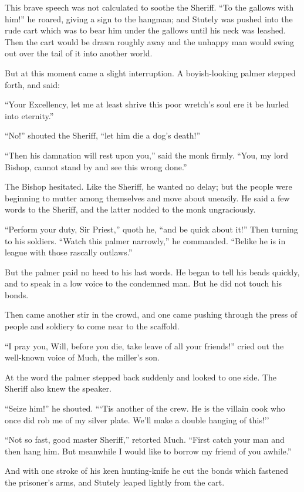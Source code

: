 This brave speech was not calculated to soothe the Sheriff. ``To the
gallows with him!'' he roared, giving a sign to the hangman; and Stutely
was pushed into the rude cart which was to bear him under the gallows
until his neck was leashed. Then the cart would be drawn roughly away
and the unhappy man would swing out over the tail of it into another
world.

But at this moment came a slight interruption. A boyish-looking palmer
stepped forth, and said:

``Your Excellency, let me at least shrive this poor wretch's soul ere it
be hurled into eternity.''

``No!'' shouted the Sheriff, ``let him die a dog's death!''

``Then his damnation will rest upon you,'' said the monk firmly. ``You,
my lord Bishop, cannot stand by and see this wrong done.''

The Bishop hesitated. Like the Sheriff, he wanted no delay; but the
people were beginning to mutter among themselves and move about
uneasily. He said a few words to the Sheriff, and the latter nodded to
the monk ungraciously.

``Perform your duty, Sir Priest,'' quoth he, ``and be quick about it!''
Then turning to his soldiers. ``Watch this palmer narrowly,'' he
commanded. ``Belike he is in league with those rascally outlaws.''

But the palmer paid no heed to his last words. He began to tell his
beads quickly, and to speak in a low voice to the condemned man. But he
did not touch his bonds.

Then came another stir in the crowd, and one came pushing through the
press of people and soldiery to come near to the scaffold.

``I pray you, Will, before you die, take leave of all your friends!''
cried out the well-known voice of Much, the miller's son.

At the word the palmer stepped back suddenly and looked to one side. The
Sheriff also knew the speaker.

``Seize him!'' he shouted. ```Tis another of the crew. He is the villain
cook who once did rob me of my silver plate. We'll make a double hanging
of this!''

``Not so fast, good master Sheriff,'' retorted Much. ``First catch your
man and then hang him. But meanwhile I would like to borrow my friend of
you awhile.''

And with one stroke of his keen hunting-knife he cut the bonds which
fastened the prisoner's arms, and Stutely leaped lightly from the cart.

